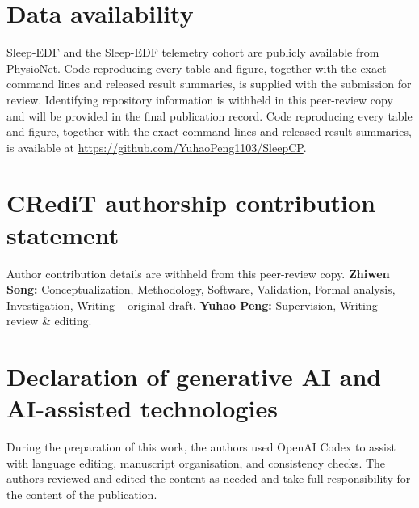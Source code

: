 \documentclass[preprint,12pt]{elsarticle}
\theoremstyle{definition}
\theoremstyle{remark}
\begin{document}
\section*{Data availability}
Sleep-EDF and the Sleep-EDF telemetry cohort are publicly available from
PhysioNet.
\ifdefined\ANONYMOUS
Code reproducing every table and figure, together with the exact command
lines and released result summaries, is supplied with the submission for
review. Identifying repository information is withheld in this peer-review
copy and will be provided in the final publication record.
\else
Code reproducing every table and figure, together with the exact command
lines and released result summaries, is available at
\url{https://github.com/YuhaoPeng1103/SleepCP}.
\fi

\section*{CRediT authorship contribution statement}
\ifdefined\ANONYMOUS
Author contribution details are withheld from this peer-review copy.
\else
\textbf{Zhiwen Song:} Conceptualization, Methodology, Software, Validation,
Formal analysis, Investigation, Writing -- original draft. \textbf{Yuhao
Peng:} Supervision, Writing -- review \& editing.
\fi

\section*{Declaration of generative AI and AI-assisted technologies}
During the preparation of this work, the authors used OpenAI Codex to assist
with language editing, manuscript organisation, and consistency checks. The
authors reviewed and edited the content as needed and take full responsibility
for the content of the publication.


\end{document}
